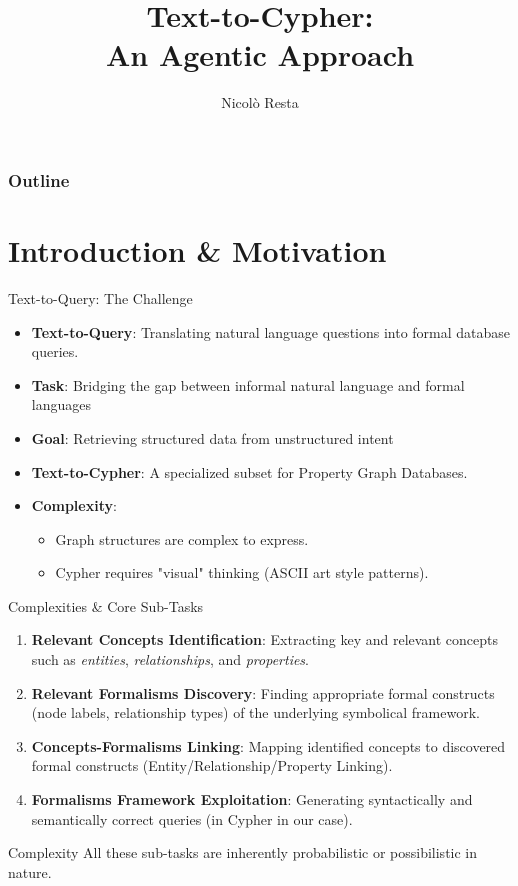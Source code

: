 \documentclass[aspectratio=169]{beamer}
\title[Text-to-Cypher: An Agentic Approach]{
  Text-to-Cypher: \\
  An Agentic Approach
}
\author{Nicolò Resta}
\institute{University of Bari, Aldo Moro}
\begin{document}
{
  \begin{frame}
    \titlepage
  \end{frame}
}

\begin{frame}
  \frametitle{Outline}
  \tableofcontents
\end{frame}

\section{Introduction \& Motivation}

\begin{frame}{Text-to-Query: The Challenge}
  \begin{itemize}
    \item \textbf{Text-to-Query}: Translating natural language questions into formal database queries.
    \item \textbf{Task}: Bridging the gap between informal natural language and formal languages
    \item \textbf{Goal}: Retrieving structured data from unstructured intent
    \item \textbf{Text-to-Cypher}: A specialized subset for Property Graph Databases.
    \item \textbf{Complexity}:
      \begin{itemize}
        \item Graph structures are complex to express.
        \item Cypher requires "visual" thinking (ASCII art style patterns).
      \end{itemize}
  \end{itemize}
\end{frame}

\begin{frame}{Complexities \& Core Sub-Tasks}
  \begin{enumerate}
    \item \textbf{Relevant Concepts Identification}: Extracting key and relevant concepts such as \textit{entities}, \textit{relationships}, and \textit{properties}.
    \item \textbf{Relevant Formalisms Discovery}: Finding appropriate formal constructs (node labels, relationship types) of the  underlying symbolical framework.
    \item \textbf{Concepts-Formalisms Linking}: Mapping identified concepts to discovered formal constructs (Entity/Relationship/Property Linking).
    \item \textbf{Formalisms Framework Exploitation}: Generating syntactically and semantically correct queries (in Cypher in our case).
  \end{enumerate}

  \begin{block}{Complexity}
    All these sub-tasks are inherently probabilistic or possibilistic in nature.
  \end{block}
\end{frame}
\end{document}
